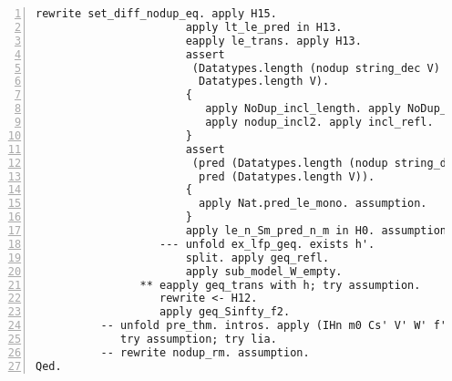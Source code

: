 \begin{lstlisting}[language=Coq, label={lst:thm_32_full_proof}, caption={Full proof of Theorem 3.2 in Coq}, numbers=left]
                       rewrite set_diff_nodup_eq. apply H15.
                       apply lt_le_pred in H13.
                       eapply le_trans. apply H13.
                       assert
                        (Datatypes.length (nodup string_dec V) <=
                         Datatypes.length V).
                       {
                          apply NoDup_incl_length. apply NoDup_nodup.
                          apply nodup_incl2. apply incl_refl.
                       }
                       assert
                        (pred (Datatypes.length (nodup string_dec V)) <=
                         pred (Datatypes.length V)).
                       {
                         apply Nat.pred_le_mono. assumption.
                       }
                       apply le_n_Sm_pred_n_m in H0. assumption.
                   --- unfold ex_lfp_geq. exists h'.
                       split. apply geq_refl.
                       apply sub_model_W_empty.
                ** eapply geq_trans with h; try assumption.
                   rewrite <- H12.
                   apply geq_Sinfty_f2.
          -- unfold pre_thm. intros. apply (IHn m0 Cs' V' W' f');
             try assumption; try lia.
          -- rewrite nodup_rm. assumption.
Qed.
\end{lstlisting}
